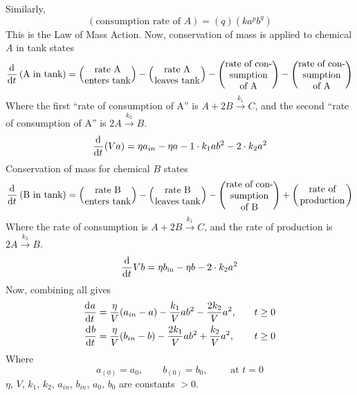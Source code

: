 \documentclass[12pt]{article}
\begin{document}
Similarly,
\begin{equation}
  \left(\text{consumption rate of }A\right) = (q)(ka^p b^q)
\end{equation}
This is the Law of Mass Action. Now, conservation of mass is applied to chemical
$A$ in tank states
\begin{equation}
  \begin{aligned}
    \od{}{t}\left(\text{A in tank}\right) = \left(\text{\parbox{5em}{\centering rate A enters tank}}\right) -
    \left(\text{\parbox{5em}{\centering rate A leaves tank}}\right) -
    \left(\text{\parbox{5em}{\centering rate of consumption of A}}\right) -
    \left(\text{\parbox{5em}{\centering rate of consumption of A}}\right)
  \end{aligned}
\end{equation}
Where the first ``rate of consumption of A'' is $A + 2B \xrightarrow{k_1} C$,
and the second ``rate of consumption of A'' is $2A \xrightarrow{k_2} B$.
\begin{equation}
  \begin{aligned}
    \frac{\mathrm{d}^{} {}}{\mathrm{d}{t}^{}}(Va) = \eta a_{in} - \eta a - 1\cdot k_1ab^2 - 2\cdot k_2a^2
  \end{aligned}
\end{equation}
Conservation of mass for chemical $B$ states
\begin{equation}
  \od{}{t}\left(\text{B in tank}\right) = \left(\text{\parbox{5em}{\centering rate B enters tank}}\right) -
  \left(\text{\parbox{5em}{\centering rate B leaves tank}}\right) -
  \left(\text{\parbox{5em}{\centering rate of consumption of B}}\right) +
  \left(\text{\parbox{5em}{\centering rate of production}}\right)
\end{equation}
Where the rate of consumption is $A + 2B \xrightarrow{k_1} C$, and the rate of
production is $2A \xrightarrow{k_2} B$.
\begin{equation}
  \frac{\mathrm{d}^{} {}}{\mathrm{d}{t}^{}}Vb = \eta b_{\text{in}} - \eta b - 2\cdot k_2a^2
\end{equation}
Now, combining all gives
\begin{equation}
  \begin{aligned}
    \frac{\mathrm{d}^{} {a}}{\mathrm{d}{t}^{}} &= \frac{\eta}{V}(a_{in}-a) - \frac{k_1}{V}ab^2 - \frac{2k_2}{V}a^2, &\quad t&\ge0 \\
    \frac{\mathrm{d}^{} {b}}{\mathrm{d}{t}^{}} &= \frac{\eta}{V}(b_{in}-b) - \frac{2k_1}{V}ab^2 + \frac{k_2}{V}a^2, &\quad t&\ge0 \\
  \end{aligned}
\end{equation}
Where
\begin{equation}
  a_{(0)}=a_0,\qquad b_{(0)}=b_0,\qquad \text{ at } t=0
\end{equation}
$\eta$, $V$, $k_1$, $k_2$, $a_{in}$, $b_{in}$, $a_0$, $b_0$ are constants $>0$.
\end{document}
